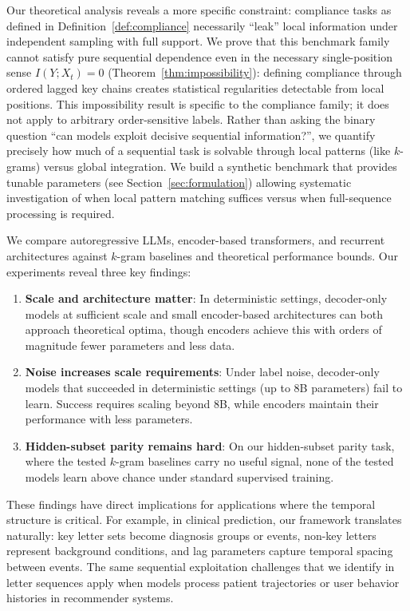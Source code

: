 \documentclass{article}
\theoremstyle{plain}
\theoremstyle{definition}
\theoremstyle{remark}
\begin{document}
Our theoretical analysis reveals a more specific constraint: compliance tasks as defined in Definition~\ref{def:compliance} necessarily ``leak'' local information under independent sampling with full support. We prove that this benchmark family cannot satisfy pure sequential dependence even in the necessary single-position sense $I(Y;X_t)=0$ (Theorem~\ref{thm:impossibility}): defining compliance through ordered lagged key chains creates statistical regularities detectable from local positions. This impossibility result is specific to the compliance family; it does not apply to arbitrary order-sensitive labels. Rather than asking the binary question ``can models exploit decisive sequential information?'', we quantify precisely how much of a sequential task is solvable through local patterns (like $k$-grams) versus global integration. We build a synthetic benchmark that provides tunable parameters (see Section~\ref{sec:formulation}) allowing systematic investigation of when local pattern matching suffices versus when full-sequence processing is required.

We compare autoregressive LLMs, encoder-based transformers, and recurrent architectures against $k$-gram baselines and theoretical performance bounds. Our experiments reveal three key findings:

\begin{enumerate}
    
    \item \textbf{Scale and architecture matter}: In deterministic settings, decoder-only models at sufficient scale and small encoder-based architectures can both approach theoretical optima, though encoders achieve this with orders of magnitude fewer parameters and less data.

    \item \textbf{Noise increases scale requirements}: Under label noise, decoder-only models that succeeded in deterministic settings (up to 8B parameters) fail to learn. Success requires scaling beyond 8B, while encoders maintain their performance with less parameters.

    \item \textbf{Hidden-subset parity remains hard}: On our hidden-subset parity task, where the tested $k$-gram baselines carry no useful signal, none of the tested models learn above chance under standard supervised training.
\end{enumerate}

These findings have direct implications for applications where the temporal structure is critical. For example, in clinical prediction, our framework translates naturally: key letter sets become diagnosis groups or events, non-key letters represent background conditions, and lag parameters capture temporal spacing between events. The same sequential exploitation challenges that we identify in letter sequences apply when models process patient trajectories or user behavior histories in recommender systems.
\end{document}
